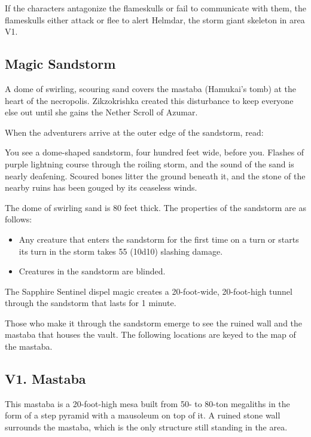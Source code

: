 \documentclass[10pt,a4paper,twoside,bg=print,twocolumn,openany,nodeprecatedcode]{dndbook}
\begin{document}
If the characters antagonize the flameskulls or fail to communicate with them, the flameskulls either attack or flee to alert Helmdar, the storm giant skeleton in area V1.

\subsection{Magic Sandstorm}
A dome of swirling, scouring sand covers the mastaba (Hamukai's tomb) at the heart of the necropolis. Zikzokrishka created this disturbance to keep everyone else out until she gains the Nether Scroll of Azumar.

When the adventurers arrive at the outer edge of the sandstorm, read:

\begin{DndReadAloud}{}
You see a dome-shaped sandstorm, four hundred feet wide, before you. Flashes of purple lightning course through the roiling storm, and the sound of the sand is nearly deafening. Scoured bones litter the ground beneath it, and the stone of the nearby ruins has been gouged by its ceaseless winds.

\end{DndReadAloud}

The dome of swirling sand is 80 feet thick. The properties of the sandstorm are as follows:


\begin{itemize}
\item Any creature that enters the sandstorm for the first time on a turn or starts its turn in the storm takes 55 (10d10) slashing damage.
\item Creatures in the sandstorm are blinded.
\end{itemize}

The Sapphire Sentinel dispel magic creates a 20-foot-wide, 20-foot-high tunnel through the sandstorm that lasts for 1 minute.

Those who make it through the sandstorm emerge to see the ruined wall and the mastaba that houses the vault. The following locations are keyed to the map of the mastaba.

\subsection{V1. Mastaba}
This mastaba is a 20-foot-high mesa built from 50- to 80-ton megaliths in the form of a step pyramid with a mausoleum on top of it. A ruined stone wall surrounds the mastaba, which is the only structure still standing in the area.
\end{document}

